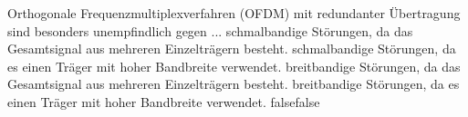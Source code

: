     {Orthogonale Frequenzmultiplexverfahren (OFDM) mit redundanter Übertragung sind besonders unempfindlich gegen ...}
    {schmalbandige Störungen, da das Gesamtsignal aus mehreren Einzelträgern besteht.}
    {schmalbandige Störungen, da es einen Träger mit hoher Bandbreite verwendet.}
    {breitbandige Störungen, da das Gesamtsignal aus mehreren Einzelträgern besteht.}
    {breitbandige Störungen, da es einen Träger mit hoher Bandbreite verwendet.}
    {false}{false}